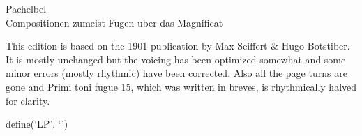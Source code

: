 \documentclass[a4paper]{memoir}
\begin{document}
\vspace{200pt}

\begin{center}
\Huge
Pachelbel \\
\Large
Compositionen zumeist Fugen uber das Magnificat
\end{center}

\vfill

This edition is based on the 1901 publication by Max Seiffert \& Hugo Botstiber. It is mostly unchanged but the voicing has been optimized somewhat and some minor errors (mostly rhythmic) have been corrected.
 Also all the page turns are gone and Primi toni fugue 15, which was written in breves, is rhythmically halved for clarity. 

\newpage
\newpage

define(`LP', `\lilypond[fragment,relative=2,staffsize=12.6,line-width=205pt,noragged-right]')

\newcommand{\RNum}[1]{\uppercase\expandafter{\romannumeral #1\relax}}
\end{document}
